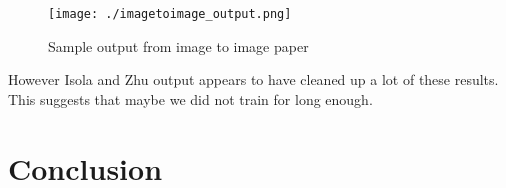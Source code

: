 \documentclass[conference]{IEEEtran}
\begin{document}
\begin{figure}[h]
  \texttt{[image: ./imagetoimage\_output.png]}
  \caption{\label{fig:imagetoimage} Sample output from image to image paper \cite{imagetoimage}}
  \centering
\end{figure}
However Isola and Zhu \cite{imagetoimage} output appears to have cleaned up a lot of these results.
This suggests that maybe we did not train for long enough.

\section{Conclusion}


%

\printbibliography
\end{document}
